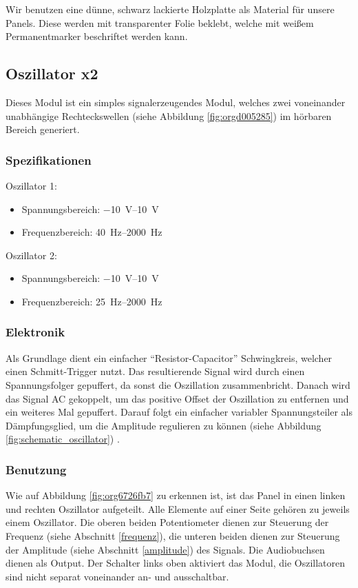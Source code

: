 Wir benutzen eine dünne, schwarz lackierte Holzplatte als Material für unsere Panels. Diese werden mit transparenter Folie beklebt, welche mit weißem Permanentmarker beschriftet werden kann.
\subsection{Oszillator x2 \label{Osci}}
\label{sec:orgf2ae8ed}
Dieses Modul ist ein simples signalerzeugendes Modul, welches zwei voneinander unabhängige Rechteckswellen (siehe Abbildung \ref{fig:orgd005285}) im hörbaren Bereich generiert.

\subsubsection{Spezifikationen}
\label{sec:org87a6e9f}
Oszillator 1:
\begin{itemize}
\item Spannungsbereich: \SIrange{-10}{+10}{\volt}
\item Frequenzbereich: \SIrange{40}{2000}{\hertz}
\end{itemize}

Oszillator 2:
\begin{itemize}
\item Spannungsbereich: \SIrange{-10}{+10}{\volt}
\item Frequenzbereich: \SIrange{25}{2000}{\hertz}
\end{itemize}

\subsubsection{Elektronik}
\label{sec:orga1fff5e}
Als Grundlage dient ein einfacher "`Resistor-Capacitor"' Schwingkreis, welcher einen Schmitt-Trigger nutzt. Das resultierende Signal wird durch einen Spannungsfolger gepuffert, da sonst die Oszillation zusammenbricht. Danach wird das Signal AC gekoppelt, um das positive Offset der Oszillation zu entfernen und ein weiteres Mal gepuffert. Darauf folgt ein einfacher variabler Spannungsteiler als Dämpfungsglied, um die Amplitude regulieren zu können (siehe Abbildung \ref{fig:schematic_oscillator}) \cite{klein:osci}. 

\subsubsection{Benutzung}
\label{sec:org33c5fe7}
Wie auf Abbildung \ref{fig:org6726fb7} zu erkennen ist, ist das Panel in einen linken und rechten Oszillator aufgeteilt. Alle Elemente auf einer Seite gehören zu jeweils einem Oszillator. Die oberen beiden Potentiometer dienen zur Steuerung der Frequenz (siehe Abschnitt \ref{frequenz}), die unteren beiden dienen zur Steuerung der Amplitude (siehe Abschnitt \ref{amplitude}) des Signals. Die Audiobuchsen dienen als Output. Der Schalter links oben aktiviert das Modul, die Oszillatoren sind nicht separat voneinander an- und ausschaltbar.

